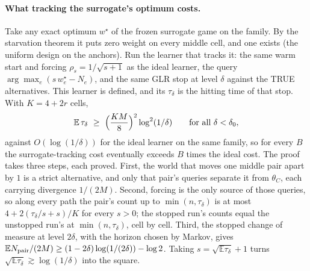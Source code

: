 \paragraph{What tracking the surrogate's optimum costs.}
Take any exact optimum $w^{\star}$ of the frozen surrogate game on the family. By the
starvation theorem it puts zero weight on every middle cell, and one exists (the uniform
design on the anchors). Run the learner that tracks it: the same warm start and forcing
$\rho_{s}=1/\sqrt{s+1}$ as the ideal learner, the query
$\arg\max_{e}(s\,w^{\star}_{e}-N_{e})$, and the same GLR stop at level $\delta$ against the
TRUE alternatives. This learner is defined, and its $\tau_{\delta}$ is the hitting time of
that stop. With $K=4+2r$ cells,
\[
\mathbb{E}\,\tau_{\delta}\ \ge\ \Bigl(\frac{KM}{8}\Bigr)^{2}\log^{2}(1/\delta)
\qquad\text{for all }\delta<\delta_{0},
\]
against $O(\log(1/\delta))$ for the ideal learner on the same family, so for every $B$ the
surrogate-tracking cost eventually exceeds $B$ times the ideal cost. The proof takes three
steps, each proved. First, the world that moves one middle pair apart by $1$ is a strict
alternative, and only that pair's queries separate it from $\theta_{C}$, each carrying
divergence $1/(2M)$. Second, forcing is the only source of those queries, so along every
path the pair's count up to $\min(n,\tau_{\delta})$ is at most
$4+2(\tau_{\delta}/s+s)/K$ for every $s>0$; the stopped run's counts equal the unstopped
run's at $\min(n,\tau_{\delta})$, cell by cell. Third, the stopped change of measure at level
$2\delta$, with the horizon chosen by Markov, gives
$\mathbb{E}N_{\rm pair}/(2M)\ge(1-2\delta)\log(1/(2\delta))-\log2$. Taking
$s=\sqrt{\mathbb{E}\tau_{\delta}}+1$ turns $\sqrt{\mathbb{E}\tau_{\delta}}\gtrsim\log(1/\delta)$
into the square.



